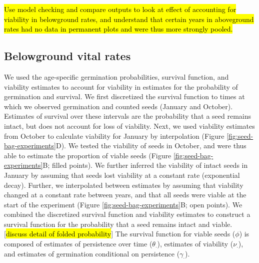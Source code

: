 \documentclass[12pt, oneside, titlepage]{article}   	%
\begin{document}
\hl{Use model checking and compare outputs to look at effect of accounting for viability in belowground rates, and understand that certain years in aboveground rates had no data in permanent plots and were thus more strongly pooled. }

\subsection{Belowground vital rates}

We used the age-specific germination probabilities, survival function, and viability estimates to account for viability in estimates for the probability of germination and survival. We first discretized the survival function to times at which we observed germination and counted seeds (January and October). Estimates of survival over these intervals are the probability that a seed remains intact, but does not account for loss of viability. Next, we used viability estimates from October to calculate viability for January by interpolation (Figure \ref{fig:seed-bag-experiments}D). We tested the viability of seeds in October, and were thus able to estimate the proportion of viable seeds (Figure \ref{fig:seed-bag-experiments}B; filled points). We further inferred the viability of intact seeds in January by assuming that seeds lost viability at a constant rate (exponential decay). Further, we interpolated between estimates by assuming that viability changed at a constant rate between years, and that all seeds were viable at the start of the experiment (Figure \ref{fig:seed-bag-experiments}B; open points). We combined the discretized survival function and viability estimates to construct a survival function for the probability that a seed remains intact and viable. [\hl{discuss detail of folded probability}] The survival function for viable seeds ($\phi$) is composed of estimates of persistence over time ($\theta_\cdot$), estimates of viability ($\nu_\cdot$), and estimates of germination conditional on persistence ($\gamma_\cdot$).
\end{document}
